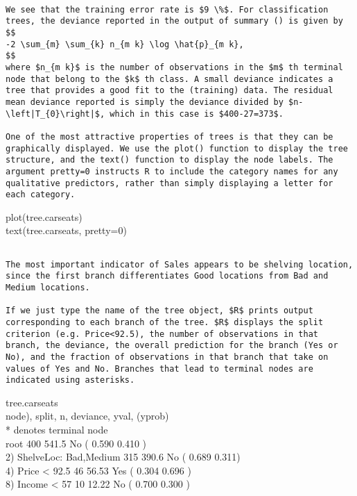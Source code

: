 \documentclass[10pt]{article}
\begin{document}
\begin{verbatim}

We see that the training error rate is $9 \%$. For classification trees, the deviance reported in the output of summary () is given by
$$
-2 \sum_{m} \sum_{k} n_{m k} \log \hat{p}_{m k},
$$
where $n_{m k}$ is the number of observations in the $m$ th terminal node that belong to the $k$ th class. A small deviance indicates a tree that provides a good fit to the (training) data. The residual mean deviance reported is simply the deviance divided by $n-\left|T_{0}\right|$, which in this case is $400-27=373$.

One of the most attractive properties of trees is that they can be graphically displayed. We use the plot() function to display the tree structure, and the text() function to display the node labels. The argument pretty=0 instructs R to include the category names for any qualitative predictors, rather than simply displaying a letter for each category.
\end{verbatim}

\begin{displayquote}
plot(tree.carseats)\\
text(tree.carseats, pretty=0)
\end{displayquote}

\begin{verbatim}

The most important indicator of Sales appears to be shelving location, since the first branch differentiates Good locations from Bad and Medium locations.

If we just type the name of the tree object, $R$ prints output corresponding to each branch of the tree. $R$ displays the split criterion (e.g. Price<92.5), the number of observations in that branch, the deviance, the overall prediction for the branch (Yes or No), and the fraction of observations in that branch that take on values of Yes and No. Branches that lead to terminal nodes are indicated using asterisks.
\end{verbatim}

\begin{displayquote}
tree.carseats\\
node), split, n, deviance, yval, (yprob)\\
* denotes terminal node\\
root 400 541.5 No ( 0.590 0.410 )\\
2) ShelveLoc: Bad,Medium 315 390.6 No ( 0.689 0.311)\\
4) Price < 92.5 46 56.53 Yes ( 0.304 0.696 )\\
8) Income < 57 10 12.22 No ( 0.700 0.300 )
\end{displayquote}
\end{document}
